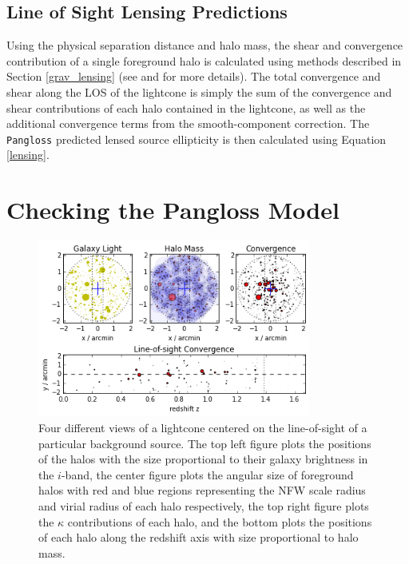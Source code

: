 \documentclass[%
 reprint,
 amsmath,amssymb,
 aps,nofootinbib
]{revtex4-1}
\begin{document}
\subsection{Line of Sight Lensing Predictions}

Using the physical separation distance and halo mass, the shear and convergence contribution of a single foreground halo is calculated using methods described in Section \ref{grav_lensing} (see \cite{lensing_calc} and \cite{nfw_bmo} for more details). The total convergence and shear along the LOS of the lightcone is simply the sum of the convergence and shear contributions of each halo contained in the lightcone, as well as the additional convergence terms from the smooth-component correction. The \texttt{Pangloss} predicted lensed source ellipticity is then calculated using Equation \eqref{lensing}.


\section{Checking the Pangloss Model} \label{check}

\begin{figure}
    \centering
    \includegraphics[width=0.8\textwidth]{figs-swe/thesis/lightcone_plots.png}
    \captionsetup{justification=raggedright,singlelinecheck=false}
    \caption{Four different views of a lightcone centered on the line-of-sight of a particular background source.  The top left figure plots the positions of the halos with the size proportional to their galaxy brightness in the $i$-band, the center figure plots the angular size of foreground halos with red and blue regions representing the NFW scale radius and virial radius of each halo respectively, the top right figure plots the $\kappa$ contributions of each halo, and the bottom plots the positions of each halo along the redshift axis with size proportional to halo mass.}
    \label{fig:lightcone}
\end{figure}
\end{document}
